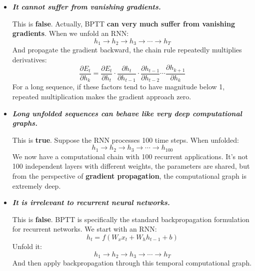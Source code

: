 \begin{itemize}
    \item[\textcolor{Red2}{\faIcon{times}}] \textcolor{Red2}{\textbf{\emph{It cannot suffer from vanishing gradients.}}}

        This is \textbf{false}. Actually, BPTT \textbf{can very much suffer from vanishing gradients}. When we unfold an RNN:
        \begin{equation*}
            h_1 \to h_2 \to h_3 \to \cdots \to h_{T}
        \end{equation*}
        And propagate the gradient backward, the chain rule repeatedly multiplies derivatives:
        \begin{equation*}
            \frac{\partial E_t}{\partial h_k} = \frac{\partial E_t}{\partial h_t} \cdot \frac{\partial h_t}{\partial h_{t-1}} \cdot \frac{\partial h_{t-1}}{\partial h_{t-2}} \cdots \frac{\partial h_{k+1}}{\partial h_k}
        \end{equation*}
        For a long sequence, if these factors tend to have magnitude below 1, repeated multiplication makes the gradient approach zero.

    \item[\textcolor{Green3}{\faIcon{check}}] \textcolor{Green3}{\textbf{\emph{Long unfolded sequences can behave like very deep computational graphs.}}}

        This is \textbf{true}. Suppose the RNN processes 100 time steps. When unfolded:
        \begin{equation*}
            h_1 \to h_2 \to h_3 \to \cdots \to h_{100}
        \end{equation*}
        We now have a computational chain with 100 recurrent applications. It's not 100 independent layers with different weights, the parameters are shared, but from the perspective of \textbf{gradient propagation}, the computational graph is extremely deep.

    \item[\textcolor{Red2}{\faIcon{times}}] \textcolor{Red2}{\textbf{\emph{It is irrelevant to recurrent neural networks.}}}

        This is \textbf{false}. BPTT is specifically the standard backpropagation formulation for recurrent networks. We start with an RNN:
        \begin{equation*}
            h_t = f\left(
                W_{x}x_t + W_{h}h_{t-1} + b
            \right)
        \end{equation*}
        Unfold it:
        \begin{equation*}
            h_1 \to h_2 \to h_3 \to \cdots \to h_{T}
        \end{equation*}
        And then apply backpropagation through this temporal computational graph.


\end{itemize}

